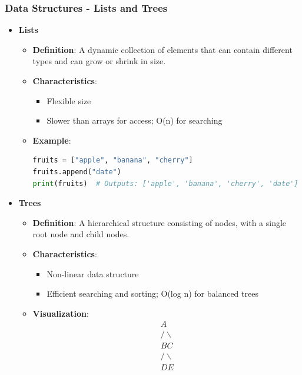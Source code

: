 \documentclass{beamer}
\begin{document}
\begin{frame}
    \frametitle{Data Structures - Lists and Trees}
    \begin{itemize}
        \item \textbf{Lists}
        \begin{itemize}
            \item \textbf{Definition}: A dynamic collection of elements that can contain different types and can grow or shrink in size.
            \item \textbf{Characteristics}:
            \begin{itemize}
                \item Flexible size
                \item Slower than arrays for access; O(n) for searching
            \end{itemize}
            \item \textbf{Example}:
            \begin{lstlisting}[language=Python]
fruits = ["apple", "banana", "cherry"]
fruits.append("date")
print(fruits)  # Outputs: ['apple', 'banana', 'cherry', 'date']
            \end{lstlisting}
        \end{itemize}
        
        \item \textbf{Trees}
        \begin{itemize}
            \item \textbf{Definition}: A hierarchical structure consisting of nodes, with a single root node and child nodes.
            \item \textbf{Characteristics}:
            \begin{itemize}
                \item Non-linear data structure
                \item Efficient searching and sorting; O(log n) for balanced trees
            \end{itemize}
            \item \textbf{Visualization}:
            \[
            \begin{array}{c}
                  A \\
                 / \backslash \\
                B   C \\
               / \backslash \\
              D   E  
            \end{array}
            \]
        \end{itemize}
    \end{itemize}
\end{frame}
\end{document}
